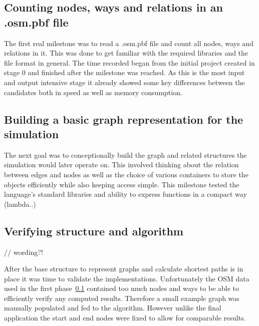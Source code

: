\subsection{Counting nodes, ways and relations in an .osm.pbf file}
\label{subsec:Approach::Implementation::Counting}

The first real milestone was to read a .osm.pbf file and count all nodes, ways and relations in it. This was done to get familiar with the required libraries and the file format in general. The time recorded began from the initial project created in stage 0 and finished after the milestone was reached. As this is the most input and output intensive stage it already showed some key differences between the candidates both in speed as well as memory consumption.

\subsection{Building a basic graph representation for the simulation}
\label{subsec:Approach::Implementation::Graph_Representation}

The next goal was to conceptionally build the graph and related structures the simulation would later operate on. This involved thinking about the relation between edges and nodes as well as the choice of various containers to store the objects efficiently while also keeping access simple. This milestone tested the language's standard libraries and ability to express functions in a compact way (lambda..)

\subsection{Verifying structure and algorithm}
\label{subsec:Approach::Implementation::Verification}

// wording?!

After the base structure to represent graphs and calculate shortest paths is in place it was time to validate the implementations. Unfortunately the OSM data used in the first phase~\ref{subsec:Approach::Implementation::Counting} contained too much nodes and ways to be able to efficiently verify any computed results. Therefore a small example graph was manually populated and fed to the algorithm. However unlike the final application the start and end nodes were fixed to allow for comparable results.
